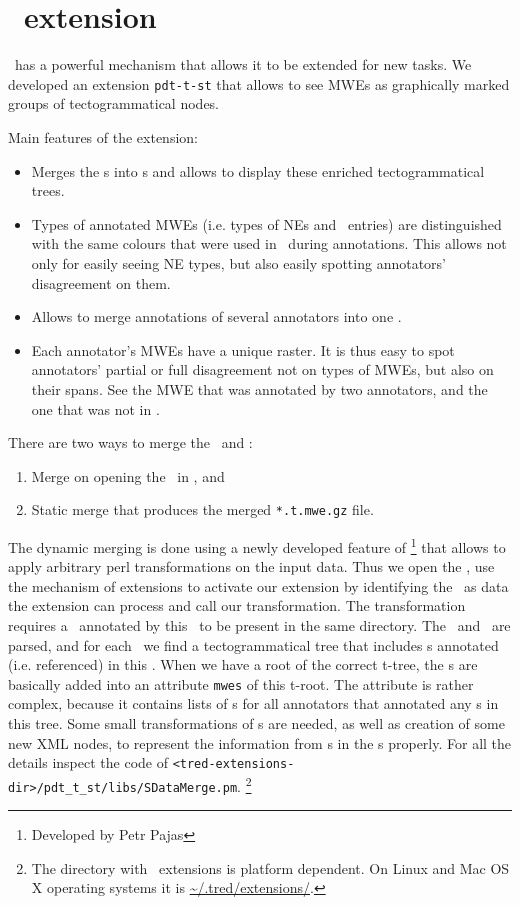 \todo


\section{\tred\ extension}
\label{sec:s:ext}

\tred\ has a powerful mechanism that allows it to be extended for new tasks. We developed an extension \texttt{pdt-t-st} that allows to see MWEs as graphically marked groups of tectogrammatical nodes. 

 Main features of the extension:
 \begin{itemize}
\item
Merges the \stf{}s into \tf{}s and allows to display these enriched tectogrammatical trees.
\item
Types of annotated MWEs (i.e. types of NEs and \semlex\ entries) are distinguished with the same colours that were used in \seman\ during annotations. This allows not only for easily seeing NE types, but also easily spotting annotators' disagreement on them. 
\item
Allows to merge annotations of several annotators into one \tf. 
\item
Each annotator's MWEs have a unique raster. It is thus easy to spot annotators' partial or full disagreement not on types of MWEs, but also on their spans. See the MWE that was annotated by two annotators, and the one that was not in .
\end{itemize}

 There are two ways to merge the \sdata\ and \tdata: 
 \begin{enumerate}
\item
Merge on opening the \stf\ in \tred, and
\item
Static merge that produces the merged \verb=*.t.mwe.gz= file. 
\end{enumerate}
The dynamic merging is done using a newly developed feature of \tred\footnote{Developed by Petr Pajas} that allows to apply arbitrary perl transformations on the input data. Thus we open the \stf, use the mechanism of extensions to activate our extension by identifying the \stf\ as data the extension can process and call our transformation. The transformation requires a \tf\ annotated by this \sf\ to be present in the same directory. The \tf\ and \sf\ are parsed, and for each \stn\ we find a tectogrammatical tree that includes \tn{}s annotated (i.e. referenced) in this \stn. When we have a root of the correct t-tree, the \stn{}s are basically added into an attribute \texttt{mwes} of this t-root. The attribute is rather complex, because it contains lists of \stn{}s for all annotators that annotated any \stn{}s in this tree. Some small transformations of \stn{}s are needed, as well as creation of some new XML nodes, to represent the information from \sf{}s in the \tf{}s properly. For all the details inspect the code of \verb=<tred-extensions-dir>/pdt_t_st/libs/SDataMerge.pm=.%
\footnote{The directory with \tred\ extensions is platform dependent. On Linux and Mac OS X operating systems it is \url{~/.tred/extensions/}.}


